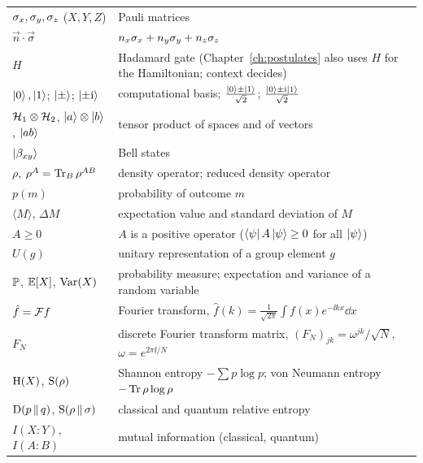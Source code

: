{\begin{longtable}{@{}p{}p{}@{}}
  \midrule
  $\sigma_x,\sigma_y,\sigma_z$ ($X,Y,Z$) & Pauli matrices\\
  $\vec n\cdot\vec\sigma$ & $n_x\sigma_x+n_y\sigma_y+n_z\sigma_z$\\
  $H$ & Hadamard gate (Chapter~\ref{ch:postulates} also uses $H$ for the Hamiltonian; context decides)\\
  $\left|0\right\rangle,\left|1\right\rangle$; $\left|\pm\right\rangle$; $\left|\pm\mathrm{i}\right\rangle$ & computational basis; $\frac{\left|0\right\rangle\pm\left|1\right\rangle}{\sqrt2}$; $\frac{\left|0\right\rangle\pm\mathrm{i}\left|1\right\rangle}{\sqrt2}$\\
  $\mathcal{H}_1\otimes\mathcal{H}_2$, $\left|a\right\rangle\otimes\left|b\right\rangle$, $\left|ab\right\rangle$ & tensor product of spaces and of vectors\\
  $\left|\beta_{xy}\right\rangle$ & Bell states\\
  $\rho$, $\rho^A=\operatorname{Tr}_B\rho^{AB}$ & density operator; reduced density operator\\
  $p(m)$ & probability of outcome $m$\\
  $\langle M\rangle$, $\Delta M$ & expectation value and standard deviation of $M$\\
  $A\ge0$ & $A$ is a positive operator ($\left\langle\psi\right| A\left|\psi\right\rangle\ge0$ for all $\left|\psi\right\rangle$)\\
  $U(g)$ & unitary representation of a group element $g$\\
  \midrule
  $\mathbb{P}$, $\mathbb{E}[X]$, $\operatorname{Var}(X)$ & probability measure; expectation and variance of a random variable\\
  $\hat f=\mathcal{F} f$ & Fourier transform, $\hat f(k)=\frac1{\sqrt{2\pi}}\int f(x)e^{-\ii kx}\dd x$\\
  $F_N$ & discrete Fourier transform matrix, $(F_N)_{jk}=\omega^{jk}/\sqrt N$, $\omega=e^{2\pi\ii/N}$\\
  $\mathrm{H}(X)$, $\mathrm{S}(\rho)$ & Shannon entropy $-\sum p\log p$; von Neumann entropy $-\operatorname{Tr}\rho\log\rho$\\
  $\mathrm{D}\!\left(p\,\middle\|\,q\right)$, $\mathrm{S}\!\left(\rho\,\middle\|\,\sigma\right)$ & classical and quantum relative entropy\\
  $I(X\!:\!Y)$, $I(A\!:\!B)$ & mutual information (classical, quantum)\\
  \bottomrule
\end{longtable}}

